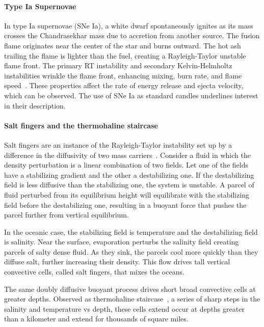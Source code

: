 \paragraph{Type Ia Supernovae}
In type Ia supernovae (SNe Ia), a white dwarf spontaneously ignites as its mass crosses the Chandrasekhar mass due to accretion from another source.
The fusion flame originates near the center of the star and burns outward.
The hot ash trailing the flame is lighter than the fuel, creating a Rayleigh-Taylor unstable flame front.
The primary RT instability and secondary Kelvin-Helmholtz instabilities wrinkle the flame front, enhancing mixing, burn rate, and flame speed~\cite{Zingale2005}.
These properties affect the rate of energy release and ejecta velocity, which can be observed.
The use of SNe Ia as standard candles underlines interest in their description.

\paragraph{Salt fingers and the thermohaline staircase}
Salt fingers are an instance of the Rayleigh-Taylor instability set up by a difference in the diffusivity of two mass carriers~\cite{Stern1969, Linden1973}.
Consider a fluid in which the density perturbation is a linear combination of two fields.
Let one of the fields have a stabilizing gradient and the other a destabilizing one.
If the destabilizing field is less diffusive than the stabilizing one, the system is unstable.
A parcel of fluid perturbed from its equilibrium height will equilibrate with the stabilizing field before the destabilizing one, resulting in a buoyant force that pushes the parcel further from vertical equilibrium.

In the oceanic case, the stabilizing field is temperature and the destabilizing field is salinity.
Near the surface, evaporation perturbs the salinity field creating parcels of salty dense fluid.
As they sink, the parcels cool more quickly than they diffuse salt, further increasing their density.
This flow drives tall vertical convective cells, called salt fingers, that mixes the oceans.

The same doubly diffusive buoyant process drives short broad convective cells at greater depths.
Observed as thermohaline staircase~\cite{Tait1971}, a series of sharp steps in the salinity and temperature vs depth, these cells extend occur at depths greater than a kilometer and extend for thousands of square miles.

